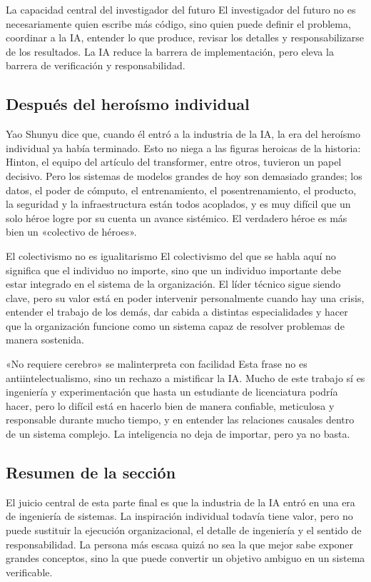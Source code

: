 \begin{importantbox}{La capacidad central del investigador del futuro}
El investigador del futuro no es necesariamente quien escribe más código, sino quien puede definir el problema, coordinar a la IA, entender lo que produce, revisar los detalles y responsabilizarse de los resultados. La IA reduce la barrera de implementación, pero eleva la barrera de verificación y responsabilidad.
\end{importantbox}

\subsection{Después del heroísmo individual}

Yao Shunyu dice que, cuando él entró a la industria de la IA, la era del heroísmo individual ya había terminado. Esto no niega a las figuras heroicas de la historia: Hinton, el equipo del artículo del transformer, entre otros, tuvieron un papel decisivo. Pero los sistemas de modelos grandes de hoy son demasiado grandes; los datos, el poder de cómputo, el entrenamiento, el posentrenamiento, el producto, la seguridad y la infraestructura están todos acoplados, y es muy difícil que un solo héroe logre por su cuenta un avance sistémico. El verdadero héroe es más bien un «colectivo de héroes».

\begin{knowledgebox}{El colectivismo no es igualitarismo}
El colectivismo del que se habla aquí no significa que el individuo no importe, sino que un individuo importante debe estar integrado en el sistema de la organización. El líder técnico sigue siendo clave, pero su valor está en poder intervenir personalmente cuando hay una crisis, entender el trabajo de los demás, dar cabida a distintas especialidades y hacer que la organización funcione como un sistema capaz de resolver problemas de manera sostenida.
\end{knowledgebox}

\begin{warningbox}{«No requiere cerebro» se malinterpreta con facilidad}
Esta frase no es antiintelectualismo, sino un rechazo a mistificar la IA. Mucho de este trabajo sí es ingeniería y experimentación que hasta un estudiante de licenciatura podría hacer, pero lo difícil está en hacerlo bien de manera confiable, meticulosa y responsable durante mucho tiempo, y en entender las relaciones causales dentro de un sistema complejo. La inteligencia no deja de importar, pero ya no basta.
\end{warningbox}

\subsection{Resumen de la sección}

El juicio central de esta parte final es que la industria de la IA entró en una era de ingeniería de sistemas. La inspiración individual todavía tiene valor, pero no puede sustituir la ejecución organizacional, el detalle de ingeniería y el sentido de responsabilidad. La persona más escasa quizá no sea la que mejor sabe exponer grandes conceptos, sino la que puede convertir un objetivo ambiguo en un sistema verificable.
